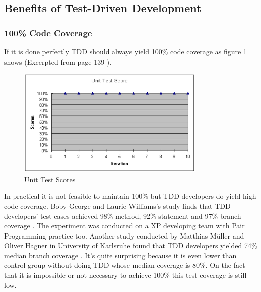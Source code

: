 \subsection{Benefits of Test-Driven Development}
\subsubsection{100\% Code Coverage}
If it is done perfectly TDD should always yield 100\% code coverage
\cite{Beck:03,Jeffries:00} as figure \ref{fig:TestScores} shows (Excerpted
from page 139 \cite{Jeffries:00}).
 
\begin{figure}[ht] 
  \centering
  \includegraphics[width=0.8\textwidth]{figs/TestScores.eps}
  \caption{Unit Test Scores}\label{fig:TestScores}
\end{figure} 

In practical it is not feasible to maintain 100\% but TDD developers do
yield high code coverage. Boby George and Laurie Williams's study finds
that TDD developers' test cases achieved 98\% method, 92\% statement and
97\% branch coverage \cite{George:02}. The experiment was conducted on a XP
developing team with Pair Programming practice too. Another study conducted
by Matthias M\"uller and Oliver Hagner in University of Karlsruhe found
that TDD developers yielded 74\% median branch coverage \cite{Muller:02}.
It's quite surprising because it is even lower than control group without
doing TDD whose median coverage is 80\%. On the fact that it is impossible
or not necessary to achieve 100\% this test coverage is still low. 

